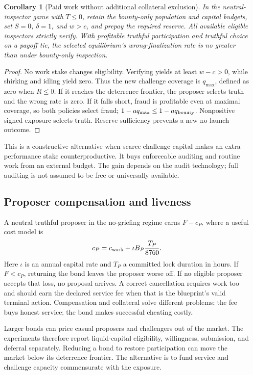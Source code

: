 \documentclass[10pt]{article}
\newtheorem{corollary}{Corollary}
\begin{document}
\begin{corollary}[Paid work without additional collateral exclusion]
\label{cor:zero_stake}
In the neutral-inspector game with $T\leq0$, retain the bounty-only population and capital budgets, set $S=0$, $\delta=1$, and $w>c$, and prepay the required reserve. All available eligible inspectors strictly verify. With profitable truthful participation and truthful choice on a payoff tie, the selected equilibrium's wrong-finalization rate is no greater than under bounty-only inspection.
\end{corollary}
\begin{proof}
No work stake changes eligibility. Verifying yields at least $w-c>0$, while shirking and idling yield zero. Thus the new challenge coverage is $q_{\max}$, defined as zero when $R\leq0$. If it reaches the deterrence frontier, the proposer selects truth and the wrong rate is zero. If it falls short, fraud is profitable even at maximal coverage, so both policies select fraud; $1-aq_{\max}\leq1-aq_{\rm bounty}$. Nonpositive signed exposure selects truth. Reserve sufficiency prevents a new no-launch outcome.
\end{proof}

This is a constructive alternative when scarce challenge capital makes an extra performance stake counterproductive. It buys enforceable auditing and routine work from an external budget. The gain depends on the audit technology; full auditing is not assumed to be free or universally available.

\subsection{Proposer compensation and liveness}

A neutral truthful proposer in the no-griefing regime earns $F-c_P$, where a useful cost model is
\[
c_P=c_{\rm work}+\iota B_P\frac{T_P}{8760}.
\]
Here $\iota$ is an annual capital rate and $T_P$ a committed lock duration in hours. If $F<c_P$, returning the bond leaves the proposer worse off. If no eligible proposer accepts that loss, no proposal arrives. A correct cancellation requires work too and should earn the declared service fee when that is the blueprint's valid terminal action. Compensation and collateral solve different problems: the fee buys honest service; the bond makes successful cheating costly.

Larger bonds can price casual proposers and challengers out of the market. The experiments therefore report liquid-capital eligibility, willingness, submission, and deferral separately. Reducing a bond to restore participation can move the market below its deterrence frontier. The alternative is to fund service and challenge capacity commensurate with the exposure.
\end{document}

